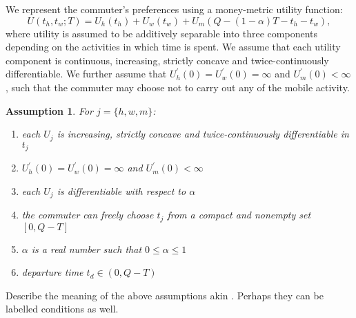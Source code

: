 \documentclass[12pt,a4paper,british]{article}
\newtheorem{assumption}{Assumption}[section]
\begin{document}





We represent the commuter's preferences using a money-metric utility function:%
\begin{equation}
U\left(t_{h},t_{w};T\right)=U_{h}\left(t_{h}\right)+U_{w}\left(t_{w}\right)+U_{m}\left(Q-\left(1-\alpha\right)T-t_{h}-t_{w}\right),
\label{utility0}
\end{equation}
where utility is assumed to be additively separable into three components depending on the activities in which time is spent. We assume that each utility component is continuous, increasing, strictly concave and twice-continuously differentiable. We further assume that $U_{h}^{\prime}\left(0\right) = U_{w}^{\prime}\left(0\right) = \infty$ and $U_{m}^{\prime}\left(0\right)<\infty$, such that the commuter may choose not to carry out any of the mobile activity.

\begin{assumption}
    For $j=\{h,w,m\}$: 
    \begin{enumerate}
        \item each $U_j$ is increasing, strictly concave and twice-continuously differentiable in $t_j$
        \item $U_{h}^{\prime}\left(0\right) = U_{w}^{\prime}\left(0\right) = \infty$ and $U_{m}^{\prime}\left(0\right)<\infty$
        \item each $U_j$ is differentiable with respect to $\alpha$
        \item the commuter can freely choose $t_j$ from a compact and nonempty set $[0, Q-T]$
        \item $\alpha$ is a real number such that $0 \leq \alpha \leq 1$
        \item departure time $t_d \in (0, Q-T)$
    \end{enumerate}
\end{assumption}

Describe the meaning of the above assumptions akin \citet{FosgerauSmall2017EndogenousSchedulingPreferences}. Perhaps they can be labelled conditions as well.
\end{document}

